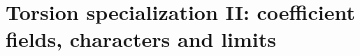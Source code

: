 \providecommand{\spnHS}{\mathrm{HS}}
\providecommand{\spncodim}{\operatorname{codim}}
\providecommand{\spnim}{\operatorname{im}}
\providecommand{\spnE}{\mathbb{E}}
\providecommand{\spnP}{\mathbb{P}}
\providecommand{\spnTV}{d_{\mathrm{TV}}}
\providecommand{\spnStab}{\operatorname{Stab}}
\providecommand{\spnMat}{\operatorname{Mat}}
\providecommand{\spnDD}{\mathfrak{D}}
\providecommand{\spnT}{\mathsf{T}}
\providecommand{\spnqbin}[3]{\genfrac{[}{]}{0pt}{}{#1}{#2}_{#3}}
\providecommand{\spnOrth}{\mathcal{O}}
\providecommand{\spnTame}{\mathcal{T}}
\providecommand{\spnEmb}{\mathcal{E}}
\providecommand{\spnAlt}{\operatorname{Alt}}
\providecommand{\spncoker}{\operatorname{coker}}
\providecommand{\torsHs}{H_{*}}
\providecommand{\torslen}{\operatorname{length}}
\providecommand{\torscoker}{\operatorname{coker}}
\providecommand{\torsadj}{\operatorname{adj}}
\providecommand{\torsFitt}{\operatorname{Fitt}}
\providecommand{\torsZ}[2]{Z_{[#1,#2]}}
\providecommand{\torsU}{\mathcal{U}}
\providecommand{\torsfiles}[1]{\begin{itemize}[nosep,leftmargin=1.5em,label=--]\footnotesize #1\end{itemize}}
\renewcommand{\arraystretch}{1.25}
\section{Torsion specialization II: coefficient fields, characters and limits}\label{sec:cost}
\providecommand{\costfiles}[1]{\begin{itemize}[nosep,leftmargin=1.5em,label=--]\footnotesize #1\end{itemize}}

